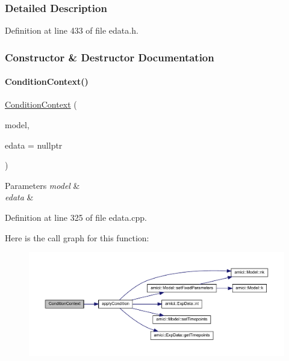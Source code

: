 \subsubsection{Detailed Description}


Definition at line 433 of file edata.\+h.



\subsubsection{Constructor \& Destructor Documentation}
\mbox{\label{classamici_1_1_condition_context_a00922f8e090c4171074b23690161c3bd}} 
\paragraph{\texorpdfstring{ConditionContext()}{ConditionContext()}}
{\footnotesize\ttfamily \mbox{\hyperlink{classamici_1_1_condition_context}{Condition\+Context}} (\begin{DoxyParamCaption}\item[{\mbox{\hyperlink{classamici_1_1_model}{Model}} $\ast$}]{model,  }\item[{const \mbox{\hyperlink{classamici_1_1_exp_data}{Exp\+Data}} $\ast$}]{edata = {\ttfamily nullptr} }\end{DoxyParamCaption})}


\begin{DoxyParams}{Parameters}
{\em model} & \\
\hline
{\em edata} & \\
\hline
\end{DoxyParams}


Definition at line 325 of file edata.\+cpp.

Here is the call graph for this function\+:
\nopagebreak
\begin{figure}[H]
\begin{center}
\leavevmode
\includegraphics[width=350pt]{classamici_1_1_condition_context_a00922f8e090c4171074b23690161c3bd_cgraph}
\end{center}
\end{figure}


